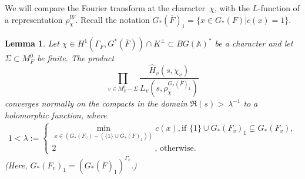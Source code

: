 \documentclass[a4paper,english,12pt]{amsart}
\newcommand{\CC}{\mathbb{C}}
\newcommand{\oF}{\overline F}
\newcommand{\Fv}{F_v}
\newcommand{\vMFz}{v\in M_F ^0}
\newcommand{\AAA}{\mathbb A}
\newcommand{\wH}{\widehat H}
\newtheorem{lem}[equation]{Lemma}
\numberwithin{equation}{subsection}
\begin{document}
\subsubsection{} 
We will compare the Fourier transform at the character~$\chi$, with the $L$-function of a representation $\rho^W_{\chi}$. Recall the notation $G_*(\oF)_1=\{x\in G_*(F)| c(x)=1\}.$ %
\begin{lem}\label{ftlfun} Let $\chi\in H^1(\Gamma_F,G^*(\oF))\cap K^{\perp}\subset BG(\AAA)^*$ be a character and let~$\Sigma\subset M_F^0$ be finite. The product %
$$\prod_{\vMFz-\Sigma}\frac{{\wH_v(s,\chi_v)}}{L_v(s,\rho_{\chi}^{G_*(\oF)_1})}$$ converges normally on the compacts in the domain $\Re(s)>~\lambda^{-1}$ to a holomorphic function, where \begin{align*}
1<\lambda:=\begin{cases} \min_{x\in (G_*(F_v)-(\{1\}\cup G_*(F)_1))}c(x), \text{if } \{1\}\cup G_*(F_v)_1\subsetneq G_*(F_v),\\
2\quad\quad\quad\quad\quad\quad\quad\quad\quad\quad\quad\quad\text{, otherwise}.
\end{cases}
\end{align*}
(Here, $G_*(\Fv)_1=(G_*(\oF)_1)^{\Gamma_v}$.)
\end{lem}
\end{document}
